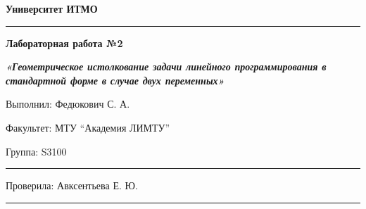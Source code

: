 \documentclass[12pt]{article}
\begin{document}
\pagestyle{empty}
\begin{center}
\large{\textbf{Университет ИТМО}}
\end{center}
\rule{500pt}{1pt}
\par\bigskip\par\bigskip\par\bigskip\par\bigskip\par\bigskip\par\bigskip\par\bigskip\par\bigskip
\begin{center}
\Large
\textbf{Лабораторная работа №2}

\textbf{\textit{«Геометрическое истолкование задачи линейного программирования в стандартной форме в случае двух переменных»}}


\end{center}
\par\bigskip\par\bigskip\par\bigskip\par\bigskip\par\bigskip\par\bigskip\par\bigskip\par\bigskip\par\bigskip\par\bigskip\par\bigskip\par\bigskip\par\bigskip\par\bigskip      
\begin{flushright}
\large
Выполнил: Федюкович С. А.
\par\bigskip
Факультет: МТУ “Академия ЛИМТУ”
\par\bigskip
Группа: S3100                       
\par\bigskip\par\bigskip\par\bigskip

\rule{150pt}{0.5pt}
\par\bigskip\par\bigskip\par\bigskip\par\bigskip                                                            
 Проверила: Авксентьева Е. Ю.
\par\bigskip \par\bigskip

\rule{150pt}{0.5pt}
\end{flushright}
\end{document}
